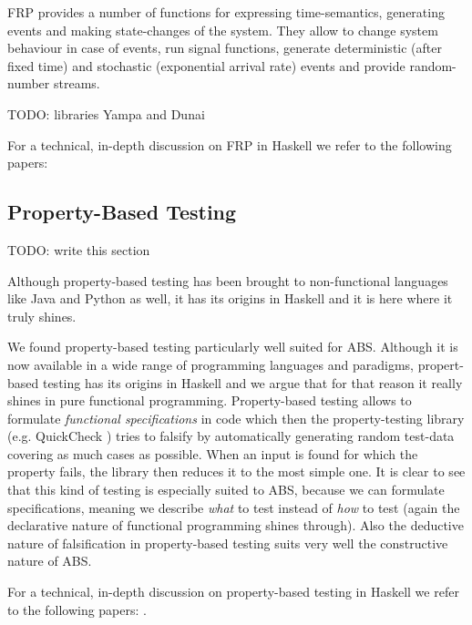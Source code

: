 FRP provides a number of functions for expressing time-semantics, generating events and making state-changes of the system. They allow to change system behaviour in case of events, run signal functions, generate deterministic (after fixed time) and stochastic (exponential arrival rate) events and provide random-number streams. 

TODO: libraries Yampa and Dunai

For a technical, in-depth discussion on FRP in Haskell we refer to the following papers: \citep{wan_functional_2000, hughes_generalising_2000, hughes_programming_2005, nilsson_functional_2002, hudak_arrows_2003, courtney_yampa_2003, perez_functional_2016, perez_extensible_2017}

\subsection{Property-Based Testing}
TODO: write this section

Although property-based testing has been brought to non-functional languages like Java and Python as well, it has its origins in Haskell and it is here where it truly shines.

We found property-based testing particularly well suited for ABS. Although it is now available in a wide range of programming languages and paradigms, propert-based testing has its origins in Haskell \citep{claessen_quickcheck:_2000, claessen_testing_2002} and we argue that for that reason it really shines in pure functional programming. Property-based testing allows to formulate \textit{functional specifications} in code which then the property-testing library (e.g. QuickCheck \citep{claessen_quickcheck:_2000}) tries to falsify by automatically generating random test-data covering as much cases as possible. When an input is found for which the property fails, the library then reduces it to the most simple one. It is clear to see that this kind of testing is especially suited to ABS, because we can formulate specifications, meaning we describe \textit{what} to test instead of \textit{how} to test (again the declarative nature of functional programming shines through). Also the deductive nature of falsification in property-based testing suits very well the constructive nature of ABS.

For a technical, in-depth discussion on property-based testing in Haskell we refer to the following papers: \citep{claessen_quickcheck:_2000, claessen_testing_2002}.


